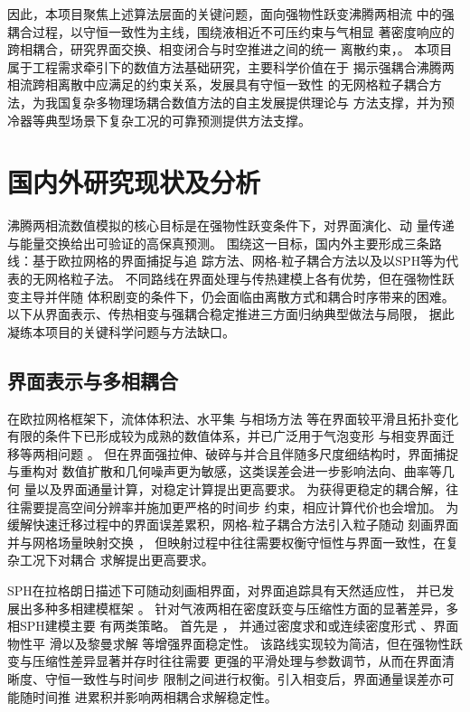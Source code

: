 因此，本项目聚焦上述算法层面的关键问题，面向强物性跃变沸腾两相流
中的强耦合过程，以守恒一致性为主线，围绕液相近不可压约束与气相显
著密度响应的跨相耦合，研究界面交换、相变闭合与时空推进之间的统一
离散约束，。
本项目属于工程需求牵引下的数值方法基础研究，主要科学价值在于
揭示强耦合沸腾两相流跨相离散中应满足的约束关系，发展具有守恒一致性
的无网格粒子耦合方法，为我国复杂多物理场耦合数值方法的自主发展提供理论与
方法支撑，并为预冷器等典型场景下复杂工况的可靠预测提供方法支撑。

\section{国内外研究现状及分析}
沸腾两相流数值模拟的核心目标是在强物性跃变条件下，对界面演化、动
量传递与能量交换给出可验证的高保真预测。
围绕这一目标，国内外主要形成三条路线：基于欧拉网格的界面捕捉与追
踪方法、网格-粒子耦合方法以及以SPH等为代表的无网格粒子法。
不同路线在界面处理与传热建模上各有优势，但在强物性跃变主导并伴随
体积剧变的条件下，仍会面临由离散方式和耦合时序带来的困难。
以下从界面表示、传热相变与强耦合稳定推进三方面归纳典型做法与局限，
据此凝练本项目的关键科学问题与方法缺口。

\subsection{界面表示与多相耦合}
在欧拉网格框架下，流体体积法、水平集
与相场方法
等在界面较平滑且拓扑变化
有限的条件下已形成较为成熟的数值体系，并已广泛用于气泡变形
与相变界面迁移等两相问题
。
但在界面强拉伸、破碎与并合且伴随多尺度细结构时，界面捕捉与重构对
数值扩散和几何噪声更为敏感，这类误差会进一步影响法向、曲率等几何
量以及界面通量计算，对稳定计算提出更高要求。
为获得更稳定的耦合解，往往需要提高空间分辨率并施加更严格的时间步
约束，相应计算代价也会增加。
为缓解快速迁移过程中的界面误差累积，网格-粒子耦合方法引入粒子随动
刻画界面并与网格场量映射交换
，
但映射过程中往往需要权衡守恒性与界面一致性，在复杂工况下对耦合
求解提出更高要求。

SPH在拉格朗日描述下可随动刻画相界面，对界面追踪具有天然适应性，
并已发展出多种多相建模框架
。
针对气液两相在密度跃变与压缩性方面的显著差异，多相SPH建模主要
有两类策略。
首先是
，
并通过密度求和或连续密度形式
、界面物性平
滑以及黎曼求解
等增强界面稳定性。
该路线实现较为简洁，但在强物性跃变与压缩性差异显著并存时往往需要
更强的平滑处理与参数调节，从而在界面清晰度、守恒一致性与时间步
限制之间进行权衡。引入相变后，界面通量误差亦可能随时间推
进累积并影响两相耦合求解稳定性。

